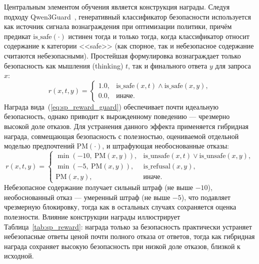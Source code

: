 Центральным элементом обучения является конструкция награды.
Следуя подходу Qwen3Guard~\cite{2510.14276}, генеративный классификатор безопасности используется как источник сигнала вознаграждения при оптимизации политики, причём предикат $\mathrm{is\_safe}(\cdot)$ истинен тогда и только тогда, когда классификатор относит содержание к категории <<safe>> (как спорное, так и небезопасное содержание считаются небезопасными).
Простейшая формулировка вознаграждает только безопасность как мышления (thinking) $t$, так и финального ответа $y$ для запроса $x$:
\begin{equation}
\label{eq:sp_reward_guard}
    r(x, t, y) =
    \begin{cases}
        1.0, & \mathrm{is\_safe}(x, t) \wedge \mathrm{is\_safe}(x, y), \\
        0.0, & \text{иначе}.
    \end{cases}
\end{equation}
Награда вида~(\ref{eq:sp_reward_guard}) обеспечивает почти идеальную безопасность, однако приводит к вырожденному поведению --- чрезмерно высокой доле отказов.
Для устранения данного эффекта применяется гибридная награда, совмещающая безопасность с полезностью, оцениваемой отдельной моделью предпочтений $\mathrm{PM}(\cdot)$, и штрафующая необоснованные отказы:
\begin{equation}
\label{eq:sp_reward_hybrid}
    r(x, t, y) =
    \begin{cases}
        \min(-10,\ \mathrm{PM}(x, y)), & \mathrm{is\_unsafe}(x, t) \vee \mathrm{is\_unsafe}(x, y), \\
        \min(-5,\ \mathrm{PM}(x, y)), & \mathrm{is\_refusal}(x, y), \\
        \mathrm{PM}(x, y), & \text{иначе}.
    \end{cases}
\end{equation}
Небезопасное содержание получает сильный штраф (не выше $-10$), необоснованный отказ --- умеренный штраф (не выше $-5$), что подавляет чрезмерную блокировку, тогда как в остальных случаях сохраняется оценка полезности.
Влияние конструкции награды иллюстрирует Таблица~\ref{tab:sp_reward}: награда только за безопасность практически устраняет небезопасные ответы ценой почти полного отказа от ответов, тогда как гибридная награда сохраняет высокую безопасность при низкой доле отказов, близкой к исходной.

